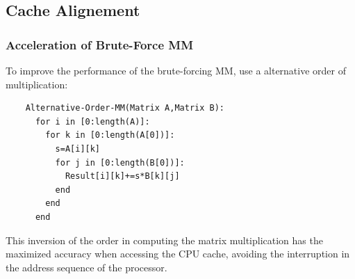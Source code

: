 \documentclass[cjk]{beamer}
\begin{document}
\subsection{Cache Alignement}
\begin{frame}[fragile]
  \frametitle{Acceleration of Brute-Force MM}

  To improve the performance of the brute-forcing MM, use a alternative order of multiplication:
  \begin{lstlisting}
    Alternative-Order-MM(Matrix A,Matrix B):
      for i in [0:length(A)]:
        for k in [0:length(A[0])]:
          s=A[i][k]
          for j in [0:length(B[0])]:
            Result[i][k]+=s*B[k][j]
          end
        end
      end
  \end{lstlisting}
  This inversion of the order in computing the matrix multiplication has the maximized accuracy when accessing the CPU cache, avoiding the interruption in the address sequence of the processor.
\end{frame}
\end{document}

